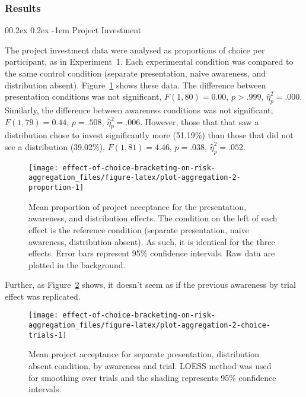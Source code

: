 \documentclass[
  english,
  man, donotrepeattitle,floatsintext]{apa7}
\makeatletter
\let\oldparagraph\paragraph
\renewcommand{\paragraph}[1]{\oldparagraph{#1}\mbox{}}
\renewcommand{\paragraph}{\@startsection{paragraph}{4}{\parindent}%
  {0\baselineskip \@plus 0.2ex \@minus 0.2ex}%
  {-1em}%
  {\normalfont\normalsize\bfseries\itshape\typesectitle}}
\theoremstyle{definition}
\theoremstyle{definition}
\theoremstyle{definition}
\theoremstyle{definition}
\theoremstyle{remark}
\makeatother
\begin{document}
\hypertarget{results-aggregation-2}{%
\subsubsection{Results}\label{results-aggregation-2}}

\hypertarget{project-investment}{%
\paragraph{Project Investment}\label{project-investment}}

The project investment data were analysed as proportions of choice per
participant, as in Experiment~1. Each experimental condition was compared to the
same control condition (separate presentation, naive awareness, and distribution
absent). Figure~\ref{fig:plot-aggregation-2-proportion} shows these data. The
difference between presentation conditions was not significant,
\(F(1, 80) = 0.00\), \(p > .999\), \(\hat{\eta}^2_p = .000\). Similarly, the
difference between awareness conditions was not significant,
\(F(1, 79) = 0.44\), \(p = .508\), \(\hat{\eta}^2_p = .006\). However, those that that saw a
distribution chose to invest significantly more
(51.19\%) than those that did
not see a distribution
(39.02\%),
\(F(1, 81) = 4.46\), \(p = .038\), \(\hat{\eta}^2_p = .052\).



\begin{figure}
\texttt{[image: effect-of-choice-bracketing-on-risk-aggregation\_files/figure-latex/plot-aggregation-2-proportion-1]} \caption{Mean proportion of project acceptance for the presentation, awareness, and distribution effects. The condition on the left of each effect is the reference condition (separate presentation, naive awareness, distribution absent). As such, it is identical for the three effects. Error bars represent 95\% confidence intervals. Raw data are plotted in the background.}\label{fig:plot-aggregation-2-proportion}
\end{figure}

Further, as Figure~\ref{fig:plot-aggregation-2-choice-trials} shows, it
doesn't seem as if the previous awareness by trial effect was replicated.



\begin{figure}
\texttt{[image: effect-of-choice-bracketing-on-risk-aggregation\_files/figure-latex/plot-aggregation-2-choice-trials-1]} \caption{Mean project acceptance for separate presentation, distribution absent condition, by awareness and trial. LOESS method was used for smoothing over trials and the shading represents 95\% confidence intervals.}\label{fig:plot-aggregation-2-choice-trials}
\end{figure}
\end{document}
